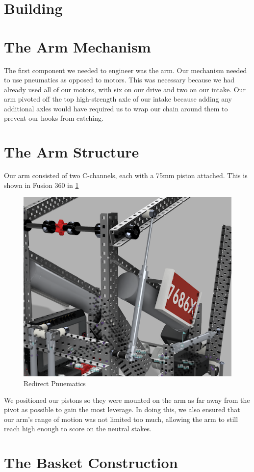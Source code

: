 \section*{Building}
\section*{The Arm Mechanism}

The first component we needed to engineer was the arm. Our mechanism needed to use pneumatics as opposed to motors. This was necessary because we had already used all of our motors, with six on our drive and two on our intake. Our arm pivoted off the top high-strength axle of our intake because adding any additional axles would have required us to wrap our chain around them to prevent our hooks from catching.

\section*{The Arm Structure}

Our arm consisted of two C-channels, each with a 75mm piston attached. This is shown in Fusion 360 in \ref{fig:redirect-pnuematics}
\begin{figure}[H]
    \centering
    \includegraphics[width=0.5\linewidth]{images/CAD Redirect Pnuematics.png}
    \caption{Redirect Pnuematics}
    \label{fig:redirect-pnuematics}
\end{figure}
We positioned our pistons so they were mounted on the arm as far away from the pivot as possible to gain the most leverage. In doing this, we also ensured that our arm’s range of motion was not limited too much, allowing the arm to still reach high enough to score on the neutral stakes.

\section*{The Basket Construction}

